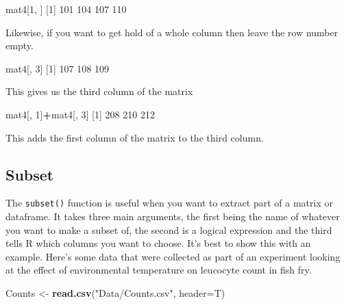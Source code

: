 \documentclass[
]{book}
\newenvironment{Shaded}{\begin{snugshade}}{\end{snugshade}}
\newcommand{\DataTypeTok}[1]{\textcolor[rgb]{0.13,0.29,0.53}{#1}}
\newcommand{\DecValTok}[1]{\textcolor[rgb]{0.00,0.00,0.81}{#1}}
\newcommand{\KeywordTok}[1]{\textcolor[rgb]{0.13,0.29,0.53}{\textbf{#1}}}
\newcommand{\NormalTok}[1]{#1}
\newcommand{\OperatorTok}[1]{\textcolor[rgb]{0.81,0.36,0.00}{\textbf{#1}}}
\newcommand{\StringTok}[1]{\textcolor[rgb]{0.31,0.60,0.02}{#1}}
\begin{document}
\begin{Shaded}
\begin{Highlighting}[]
\NormalTok{mat4[}\DecValTok{1}\NormalTok{, ]}
\NormalTok{[}\DecValTok{1}\NormalTok{] }\DecValTok{101} \DecValTok{104} \DecValTok{107} \DecValTok{110}
\end{Highlighting}
\end{Shaded}

Likewise, if you want to get hold of a whole column then leave the row number empty.

\begin{Shaded}
\begin{Highlighting}[]
\NormalTok{mat4[, }\DecValTok{3}\NormalTok{]}
\NormalTok{[}\DecValTok{1}\NormalTok{] }\DecValTok{107} \DecValTok{108} \DecValTok{109}
\end{Highlighting}
\end{Shaded}

This gives us the third column of the matrix

\begin{Shaded}
\begin{Highlighting}[]
\NormalTok{mat4[, }\DecValTok{1}\NormalTok{]}\OperatorTok{+}\NormalTok{mat4[, }\DecValTok{3}\NormalTok{]}
\NormalTok{[}\DecValTok{1}\NormalTok{] }\DecValTok{208} \DecValTok{210} \DecValTok{212}
\end{Highlighting}
\end{Shaded}

This adds the first column of the matrix to the third column.

\hypertarget{subset}{%
\subsection{Subset}\label{subset}}

The \texttt{subset()} function is useful when you want to extract part of a matrix or dataframe. It takes three main arguments, the first being the name of whatever you want to make a subset of, the second is a logical expression and the third tells R which columns you want to choose. It's best to show this with an example. Here's some data that were collected as part of an experiment looking at the effect of environmental temperature on leucocyte count in fish fry.

\begin{Shaded}
\begin{Highlighting}[]
\NormalTok{Counts <-}\StringTok{ }\KeywordTok{read.csv}\NormalTok{(}\StringTok{"Data/Counts.csv"}\NormalTok{, }\DataTypeTok{header=}\NormalTok{T)}
\end{Highlighting}
\end{Shaded}
\end{document}
